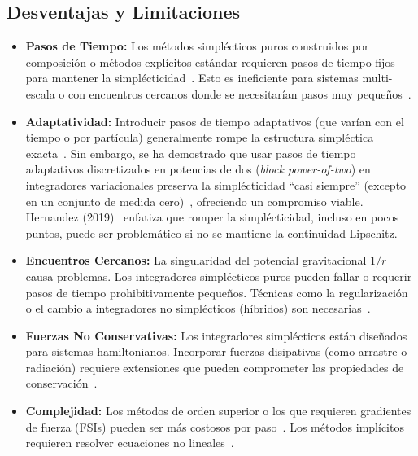 \subsection{Desventajas y Limitaciones}
\begin{itemize}
    \item \textbf{Pasos de Tiempo:} Los métodos simplécticos puros construidos por composición o métodos explícitos estándar requieren pasos de tiempo fijos para mantener la simplécticidad~\cite{stuchi2002, farr2007}. Esto es ineficiente para sistemas multi-escala o con encuentros cercanos donde se necesitarían pasos muy pequeños~\cite{hernandez2020, Hernandez2015}.
    \item \textbf{Adaptatividad:} Introducir pasos de tiempo adaptativos (que varían con el tiempo o por partícula) generalmente rompe la estructura simpléctica exacta~\cite{farr2007, Hernandez2015}. Sin embargo, se ha demostrado que usar pasos de tiempo adaptativos discretizados en potencias de dos (\textit{block power-of-two}) en integradores variacionales preserva la simplécticidad ``casi siempre'' (excepto en un conjunto de medida cero)~\cite{Hernandez2015}, ofreciendo un compromiso viable. Hernandez (2019)~\cite{hernandez2019b} enfatiza que romper la simplécticidad, incluso en pocos puntos, puede ser problemático si no se mantiene la continuidad Lipschitz.
    \item \textbf{Encuentros Cercanos:} La singularidad del potencial gravitacional \(1/r\) causa problemas. Los integradores simplécticos puros pueden fallar o requerir pasos de tiempo prohibitivamente pequeños. Técnicas como la regularización o el cambio a integradores no simplécticos (híbridos) son necesarias~\cite{hernandez2020, rebound_doc}.
    \item \textbf{Fuerzas No Conservativas:} Los integradores simplécticos están diseñados para sistemas hamiltonianos. Incorporar fuerzas disipativas (como arrastre o radiación) requiere extensiones que pueden comprometer las propiedades de conservación~\cite{hernandez2019b}.
    \item \textbf{Complejidad:} Los métodos de orden superior o los que requieren gradientes de fuerza (FSIs) pueden ser más costosos por paso~\cite{chin2005, farr2007}. Los métodos implícitos requieren resolver ecuaciones no lineales~\cite{yoshida1990}.
\end{itemize}

